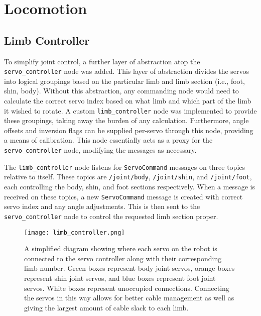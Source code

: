 \section{Locomotion}

\subsection{Limb Controller}

To simplify joint control, a further layer of abstraction atop the \texttt{servo\_controller} node was added. This layer of abstraction divides the servos into logical groupings based on the particular limb and limb section (i.e., foot, shin, body). Without this abstraction, any commanding node would need to calculate the correct servo index based on what limb and which part of the limb it wished to rotate. A custom \texttt{limb\_controller} node was implemented to provide these groupings, taking away the burden of any calculation. Furthermore, angle offsets and inversion flags can be supplied per-servo through this node, providing a means of calibration. This node essentially acts as a proxy for the \texttt{servo\_controller} node, modifying the messages as necessary.

The \texttt{limb\_controller} node listens for \texttt{ServoCommand} messages on three topics relative to itself. These topics are \texttt{/joint/body}, \texttt{/joint/shin}, and \texttt{/joint/foot}, each controlling the body, shin, and foot sections respectively. When a message is received on these topics, a new \texttt{ServoCommand} message is created with correct servo index and any angle adjustments. This is then sent to the \texttt{servo\_controller} node to control the requested limb section proper.

\begin{figure}[!h]
    \centering
    \texttt{[image: limb\_controller.png]}
    \caption{A simplified diagram showing where each servo on the robot is connected to the servo controller along with their corresponding limb number. Green boxes represent body joint servos, orange boxes represent shin joint servos, and blue boxes represent foot joint servos. White boxes represent unoccupied connections. Connecting the servos in this way allows for better cable management as well as giving the largest amount of cable slack to each limb.}
    \label{fig:servo_pins}
\end{figure}


